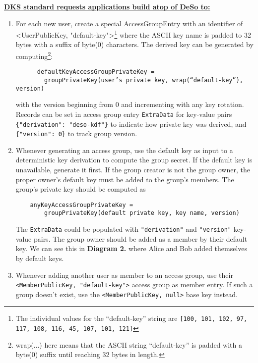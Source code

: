 \documentclass[oneside, 12pt]{article}
\newcommand{\fn}[1]{\footnote{\hangpara{1.4em}{1} #1}}
\begin{document}
\noindent\underline{\textbf{DKS standard requests applications build atop of DeSo to:}}

\begin{enumerate}
  \item For each new user, create a special AccessGroupEntry with an identifier of <UserPublicKey, "default-key">\fn{The individual values for the “default-key” string are \texttt{[100, 101, 102, 97, 117, 108, 116, 45, 107, 101, 121]}} where the ASCII key name is padded to 32 bytes with a suffix of byte(0) characters. The derived key can be generated by computing\fn{wrap(...) here means that the ASCII string “default-key” is padded with a byte(0) suffix until reaching 32 bytes in length.}:
  \begin{verbatim}
      defaultKeyAccessGroupPrivateKey =
        groupPrivateKey(user’s private key, wrap(“default-key”), version)
  \end{verbatim}
  \vspace*{-0.5cm}
  with the version beginning from 0 and incrementing with any key rotation. Records can be set in access group entry \texttt{ExtraData} for key-value pairs \texttt{\{"derivation": "deso-kdf"\}} to indicate how private key was derived, and \texttt{\{"version": 0\}} to track group version.

  \item Whenever generating an access group, use the default key as input to a deterministic key derivation to compute the group secret. If the default key is unavailable, generate it first. If the group creator is not the group owner, the proper owner’s default key must be added to the group’s members. The group’s private key should be computed as
  \begin{verbatim}
    anyKeyAccessGroupPrivateKey =
        groupPrivateKey(default private key, key name, version)
  \end{verbatim}
  \vspace*{-0.5cm}
  The \texttt{ExtraData} could be populated with \texttt{"derivation"} and \texttt{"version"} key-value pairs. The group owner should be added as a member by their default key. We can see this in \textbf{Diagram 2.} where Alice and Bob added themselves by default keys.

  \item Whenever adding another user as member to an access group, use their \texttt{<MemberPublicKey, "default-key">} access group as member entry. If such a group doesn’t exist, use the \texttt{<MemberPublicKey, null>} base key instead.

\end{enumerate}
\end{document}
